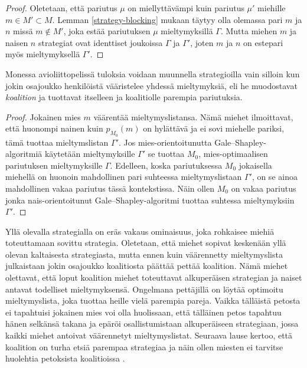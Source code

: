 \documentclass[finnish]{tktltiki2}
\newtheorem{lau}{Lause}
\theoremstyle{definition}
\theoremstyle{remark}
\begin{document}
\begin{proof}
	Oletetaan, että pariutus $\mu$ on miellyttävämpi kuin pariutus $\mu'$ miehille $m \in M' \subset M$. Lemman \ref{strategy-blocking} mukaan täytyy olla olemassa pari $m$ ja $n$ missä $m \notin M'$, joka estää pariutuksen $\mu$ mieltymyksillä $\Gamma$. Mutta miehen $m$ ja naisen $n$ strategiat ovat identtiset joukoissa $\Gamma$ ja $\Gamma'$, joten $m$ ja $n$ on estepari myös mieltymyksellä $\Gamma'$.
\end{proof}

Monessa avioliittopelissä tuloksia voidaan muunnella strategioilla vain silloin kun jokin osajoukko henkilöistä vääristelee yhdessä mieltymyksiä, eli he muodostavat \emph{koalition} ja tuottavat itselleen ja koalitiolle parempia pariutuksia.


\begin{proof}
	Jokainen mies $m$ väärentää mieltymyslistansa. Nämä miehet ilmoittavat, että huonompi nainen kuin $p_{M_0}(m)$ on hylättävä ja ei sovi miehelle pariksi, tämä tuottaa mieltymslistan $\Gamma'$. Jos mies-orientoitunutta Gale--Shapley-algoritmiä käytetään mieltymyksille $\Gamma'$ se tuottaa $M_0$, mies-optimaalisen pariutuksen mieltymyksille $\Gamma$. Edelleen, koska pariutuksessa $M_0$ jokaisella miehellä on huonoin mahdollinen pari suhteessa mieltymyslistaan $\Gamma'$, on se ainoa mahdollinen vakaa pariutus tässä kontekstissa. Näin ollen $M_0$ on vakaa pariutus jonka nais-orientoitunut Gale--Shapley-algoritmi tuottaa suhtessa mieltymyksiin $\Gamma'$.
\end{proof}

Yllä olevalla strategialla on eräs vakaus ominaisuus, joka rohkaisee miehiä toteuttamaan sovittu strategia. Oletetaan, että miehet sopivat keskenään yllä olevan kaltaisesta strategiasta, mutta ennen kuin väärennetty mieltymyslista julkaistaan jokin osajoukko koalitiosta päättää pettää koalition. Nämä miehet olettavat, että loput koalition miehet toteuttavat alkuperäisen strategian ja naiset antavat todelliset mieltymyksensä. Ongelmana pettäjillä on löytää optimoitu mieltymyslista, joka tuottaa heille vielä parempia pareja. Vaikka tälläistä petosta ei tapahtuisi jokainen mies voi olla huolissaan, että tälläinen petos tapahtuu hänen selkänsä takana ja epäröi osallistumistaan alkuperäiseen strategiaan, jossa kaikki miehet antoivat väärennetyt mieltymyslistat. Seuraava lause kertoo, että koalition on turha etsiä parempaa strategiaa ja näin ollen miesten ei tarvitse huolehtia petoksista koalitioissa \cite{gusfield1989stable}.
\end{document}
